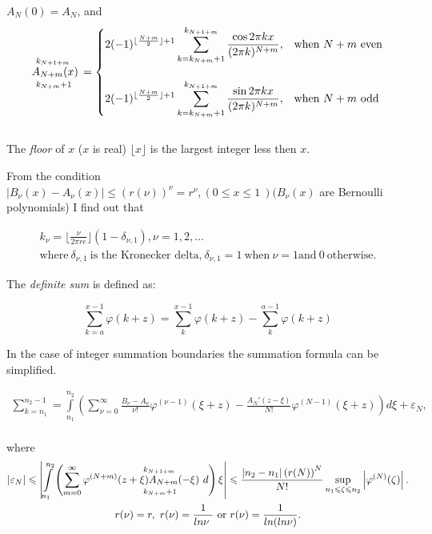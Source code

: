 \documentclass[12pt]{article}
\theoremstyle{plain}
\theoremstyle{definition}
\numberwithin{equation}{section}
\begin{document}
$A_N(0)=A_N$, and\\
\begin{equation*}
A_{N+m}(x)\hspace{-3.8em}\rule[-10pt]{0pt}{2.3em}_{k_{N+m}+1}^{k_{N+1+m}}\hspace{0.7em}=\begin{cases}
\displaystyle{2(-1)^{\lfloor\frac{N+m}{2}\rfloor+1}}\sum_{k=k_{N+m}+1}^{k_{N+1+m}}\frac{\cos 2\pi kx}{(2\pi k)^{N+m}},&\text{when $N+m$ even}\\
\rule{0pt}{1em}\\
\displaystyle{2(-1)^{\lfloor\frac{N+m}{2}\rfloor+1}}\sum_{k=k_{N+m}+1}^{k_{N+1+m}}\frac{\sin 2\pi kx}{(2\pi k)^{N+m}},&\text{when $N+m$ odd}
\end{cases}
\end{equation*}\\

The \emph{floor} of $x$ ($x$ is real) $\lfloor x\rfloor$ is the largest integer less then $x$.

From the condition $|B_{\nu}(x)-A_{\nu}(x)|\leqslant (r(\nu))^{\nu}=r^{\nu},(0\leqslant x\leqslant 1\ )(B_{\nu}(x)$ are Bernoulli polynomials) I find out that 

\begin{multline*}
k_{\nu}=\lfloor\frac{\nu}{2\pi re}\rfloor(1-\delta_{\nu,1}), \nu=1,2,\dots\\
 \text{where}\ \delta_{\nu,1}\ \text{is the Kronecker delta,}\ \delta_{\nu,1}=1\ \text{when}\ \nu=1 \text{and}\ 0\ \text{otherwise.}
\end{multline*}

The {\em definite sum} is defined as:

\begin{equation*}
\sum\limits_{k=a}^{x-1}\varphi(k+z)=\sum\limits_{k}^{x-1}\varphi(k+z)-\sum\limits_{k}^{a-1}\varphi(k+z)
\end{equation*}

In the case of integer summation boundaries the summation formula can be simplified. 

\begin{multline*}
\sum_{k=n_1}^{n_2-1}=\int\limits_{n_1}^{n_2}\left(\sum_{\nu=0}^{\infty}\frac{B_{\nu}-A_{\nu}}{\nu!}\varphi^{(\nu-1)}(\xi+z)-\frac{A_N'(z-\xi)}{N!}\varphi^{(N-1)}(\xi+z)\right)d\xi+\varepsilon_N,
\end{multline*}\\
where\\
\begin{multline*}
|\varepsilon_N|\leqslant\left|\int\limits_{n_1}^{n_2}\left(\sum_{m=0}^{\infty}\varphi^{(N+m)}(z+\xi)A_{N+m}(-\xi)\hspace{-5.4em}\rule[-10pt]{0pt}{2.3em}_{k_{N+m}+1}^{k_{N+1+m}}\hspace{2.5em}d\right)\xi\right|\leqslant\frac{|n_2-n_1|\left(r(N)\right)^N}{N!}\sup_{n_1\leqslant\zeta\leqslant n_2}\left|\varphi^{(N)}(\zeta)\right|.\\
r(\nu)=r,\ r(\nu)=\frac{1}{ln\nu\ }\text{\ or\ }r(\nu)=\frac{1}{ln(ln\nu)}.
\end{multline*} 
\end{document}
